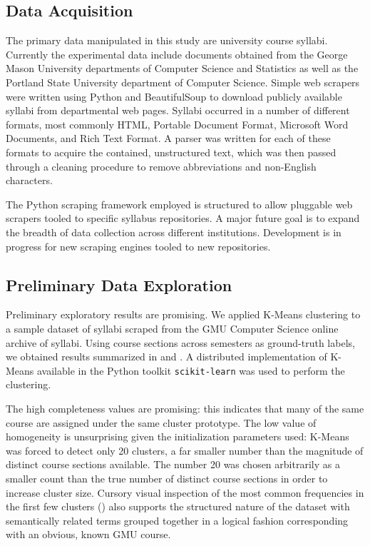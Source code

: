 \subsection{Data Acquisition}

The primary data manipulated in this study are university course syllabi.
Currently the experimental data include documents obtained from the George
Mason University departments of Computer Science and Statistics as well as
the Portland State University department of Computer Science. Simple web
scrapers were written using Python and BeautifulSoup to download publicly
available syllabi from departmental web pages. Syllabi occurred in a number
of different formats, most commonly HTML, Portable Document Format,
Microsoft Word Documents, and Rich Text Format. A parser was written for
each of these formats to acquire the contained, unstructured text, which
was then passed through a cleaning procedure to remove abbreviations and
non-English characters.

The Python scraping framework employed is structured to allow pluggable web
scrapers tooled to specific syllabus repositories. A major future goal is
to expand the breadth of data collection across different institutions.
Development is in progress for new scraping engines tooled to new
repositories.


\subsection{Preliminary Data Exploration}

Preliminary exploratory results are promising. We applied K-Means
clustering to a sample dataset of syllabi scraped from the GMU Computer
Science online archive of syllabi. Using course sections across semesters
as ground-truth labels, we obtained results summarized in
 and . A
distributed implementation of K-Means available in the Python toolkit
\texttt{scikit-learn} was used to perform the clustering.

The high completeness values are promising: this indicates that many of the
same course are assigned under the same cluster prototype. The low value of
homogeneity is unsurprising given the initialization parameters used:
K-Means was forced to detect only 20 clusters, a far smaller number than
the magnitude of distinct course sections available. The number 20 was
chosen arbitrarily as a smaller count than the true number of distinct
course sections in order to increase cluster size. Cursory visual
inspection of the most common frequencies in the first few clusters
() also supports the structured nature of the
dataset with semantically related terms grouped together in a logical
fashion corresponding with an obvious, known GMU course.

